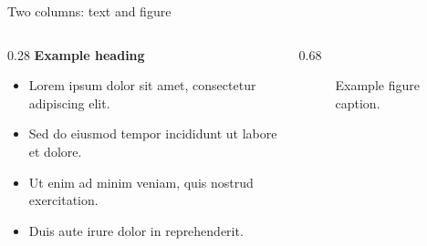 \begin{frame}[t]{Two columns: text and figure}
    \begin{columns}[T,onlytextwidth]
        \begin{column}{0.28\textwidth}
            \textbf{Example heading}
            \begin{itemize}
                \item Lorem ipsum dolor sit amet, consectetur adipiscing elit.
                \item Sed do eiusmod tempor incididunt ut labore et dolore.
                \item Ut enim ad minim veniam, quis nostrud exercitation.
                \item Duis aute irure dolor in reprehenderit.
            \end{itemize}
        \end{column}
        \begin{column}{0.68\textwidth}
            \begin{figure}
                \centering
                \caption{Example figure caption.}
            \end{figure}
        \end{column}
    \end{columns}
\end{frame}

